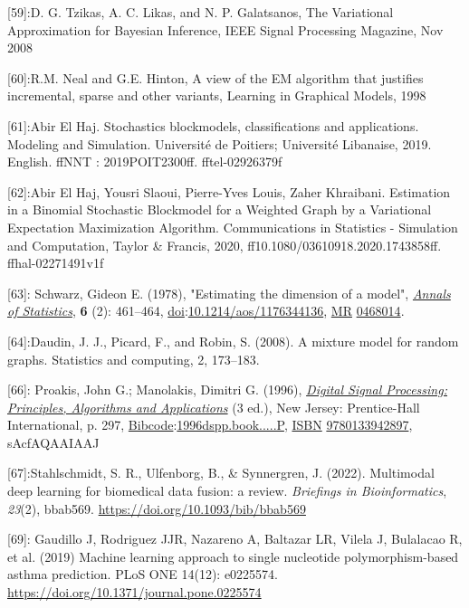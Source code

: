 \documentclass[
]{article}
\begin{document}
{[}59{]}:D. G. Tzikas, A. C. Likas, and N. P. Galatsanos, The
Variational Approximation for Bayesian Inference, IEEE Signal Processing
Magazine, Nov 2008

{[}60{]}:R.M. Neal and G.E. Hinton, A view of the EM algorithm that
justifies incremental, sparse and other variants, Learning in Graphical
Models, 1998

{[}61{]}:Abir El Haj. Stochastics blockmodels, classifications and
applications. Modeling and Simulation. Université de Poitiers;
Université Libanaise, 2019. English. ffNNT : 2019POIT2300ff.
fftel-02926379f

{[}62{]}:Abir El Haj, Yousri Slaoui, Pierre-Yves Louis, Zaher Khraibani.
Estimation in a Binomial Stochastic Blockmodel for a Weighted Graph by a
Variational Expectation Maximization Algorithm. Communications in
Statistics - Simulation and Computation, Taylor \& Francis, 2020,
ff10.1080/03610918.2020.1743858ff. ffhal-02271491v1f

{[}63{]}: Schwarz, Gideon E. (1978), "Estimating the dimension of a
model",
\emph{\href{https://en.wikipedia.org/wiki/Annals_of_Statistics}{Annals
of Statistics}}, \textbf{6} (2): 461--464,
\href{https://en.wikipedia.org/wiki/Doi_(identifier)}{doi}:\href{https://doi.org/10.1214\%2Faos\%2F1176344136}{10.1214/aos/1176344136},
\href{https://en.wikipedia.org/wiki/MR_(identifier)}{MR}
\href{https://www.ams.org/mathscinet-getitem?mr=0468014}{0468014}.

{[}64{]}:Daudin, J. J., Picard, F., and Robin, S. (2008). A mixture
model for random graphs. Statistics and computing, 2, 173--183.

{[}66{]}: Proakis, John G.; Manolakis, Dimitri G. (1996),
\href{https://archive.org/details/digitalsignalpro00proa}{\emph{Digital
Signal Processing: Principles, Algorithms and Applications}} (3 ed.),
New Jersey: Prentice-Hall International, p. 297,
\href{https://en.wikipedia.org/wiki/Bibcode_(identifier)}{Bibcode}:\href{https://ui.adsabs.harvard.edu/abs/1996dspp.book.....P}{1996dspp.book.....P},
\href{https://en.wikipedia.org/wiki/ISBN_(identifier)}{ISBN}
\href{https://en.wikipedia.org/wiki/Special:BookSources/9780133942897}{9780133942897},
sAcfAQAAIAAJ

{[}67{]}:Stahlschmidt, S. R., Ulfenborg, B., \& Synnergren, J. (2022).
Multimodal deep learning for biomedical data fusion: a review.
\emph{Briefings in Bioinformatics}, \emph{23}(2), bbab569.
\url{https://doi.org/10.1093/bib/bbab569}

{[}69{]}: Gaudillo J, Rodriguez JJR, Nazareno A, Baltazar LR, Vilela J,
Bulalacao R, et al. (2019) Machine learning approach to single
nucleotide polymorphism-based asthma prediction. PLoS ONE 14(12):
e0225574. \url{https://doi.org/10.1371/journal.pone.0225574}
\end{document}
